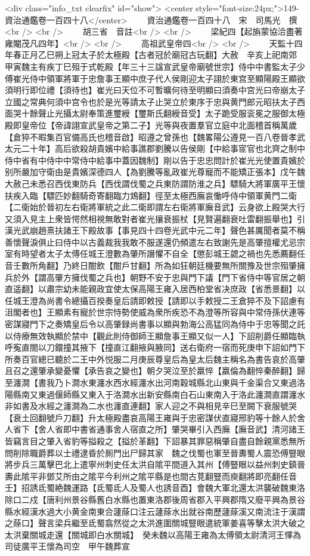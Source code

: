 <div class="info_txt clearfix" id="show">
<center style="font-size:24px;">149-資治通鑑卷一百四十八</center>
  　　資治通鑑卷一百四十八　宋　司馬光　撰<br />
<br />
　　胡三省　音註<br />
<br />
　　梁紀四【起旃蒙協洽盡著雍閹茂凡四年】<br />
<br />
　　高祖武皇帝四<br />
<br />
　　天監十四年春正月乙巳朔上冠太子於太極殿【古者冠於廟冠古玩翻】大赦　辛亥上祀南郊　甲寅魏主有疾丁巳殂于式乾殿【年三十三諡宣武皇帝廟號世宗】侍中中書監太子少傅崔光侍中領軍將軍于忠詹事王顯中庶子代人侯剛迎太子詡於東宫至顯陽殿王顯欲須明行即位禮【須待也】崔光曰天位不可暫曠何待至明顯曰須奏中宫光曰帝崩太子立國之常典何須中宫令也於是光等請太子止哭立於東序于忠與黄門郎元昭扶太子西面哭十餘聲止光攝太尉奉策進璽綬【璽斯氏翻綬音受】太子跪受服衮冕之服御太極殿即皇帝位【帝諱詡宣武皇帝之第二子】光等與夜置羣官立庭中北面稽首稱萬歲【倉猝不暇集百官備高氏也稽音啟】昭遵之曾孫也【魏畧陽公遵見一百八卷晉孝武太元二十年】高后欲殺胡貴嬪中給事譙郡劉騰以告侯剛【中給事宧官也北齊之制中侍中省有中侍中中常侍中給事中蓋因魏制】剛以告于忠忠問計於崔光光使置貴嬪於别所嚴加守衛由是貴嬪深德四人【為劉騰等亂政崔光尊寵而不能矯正張本】戊午魏大赦己未悉召西伐東防兵【西伐謂伐蜀之兵東防謂防淮之兵】驃騎大將軍廣平王懷扶疾入臨【驃匹妙翻騎奇寄翻臨力鴆翻】徑至太極西廡哀慟呼侍中領軍黄門二衛【二衛始於晉初左右衛將軍統之此二衛即謂左右衛將軍廡音武】云身欲上殿哭大行又須入見主上衆皆愕然相視無敢對者崔光攘衰振杖【見賢遍翻衰吐雷翻振舉也】引漢光武崩趙熹扶諸王下殿故事【事見四十四卷光武中元二年】聲色甚厲聞者莫不稱善懷聲淚俱止曰侍中以古義裁我我敢不服遂還仍頻遣左右致謝先是高肇擅權尤忌宗室有時望者太子太傅任城王澄數為肇所譖懼不自全【懲彭城王勰之禍也先悉薦翻任音壬數所角翻】乃終日酣飲【酣戶甘翻】所為如狂朝廷機要無所關豫及世宗殂肇擁兵於外【謂高肇方擁伐蜀之兵也】朝野不安于忠與門下議【門下省侍中等官居之朝直遥翻】以肅宗幼未能親政宜使太保高陽王雍入居西柏堂省决庶政【省悉景翻】以任城王澄為尚書令總攝百揆奏皇后請即敕授【請即以手敕授二王倉猝不及下詔慮有沮閣者也】王顯素有寵於世宗恃勢使威為衆所疾恐不為澄等所容與中常侍孫伏連等密謀寢門下之奏矯皇后令以高肇録尚書事以顯與勃海公高猛同為侍中于忠等聞之託以侍療無效執顯於禁中【觀此則侍御師王顯詹事王顯又似一人】下詔削爵任顯臨執呼寃直閤以刀鐶撞其掖下【撞直江翻掖與腋同】送右衛府一宿而死庚申下詔如門下所奏百官總已聽於二王中外悦服二月庚辰尊皇后為皇太后魏主稱名為書告哀於高肇且召之還肇承變憂懼【承告哀之變也】朝夕哭泣至於羸悴【羸倫為翻悴秦醉翻】歸至瀍澗【書我乃卜澗水東瀍水西水經瀍水出河南穀城縣北山東與千金渠合又東過洛陽縣南又東過偃師縣又東入于洛澗水出新安縣南白石山東南入于洛此瀍澗直謂瀍水非如書及水經之瀍澗為二水也瀍直連翻】家人迎之不與相見辛巳至闕下衰服號哭【衰土回翻號戶刀翻】升太極殿盡哀高陽王雍與于忠密謀伏直寢邢豹等十餘人於舍人省下【舍人省即中書省通事舍人宿直之所】肇哭畢引入西廡【廡音武】清河諸王皆竊言目之肇入省豹等搤殺之【搤於革翻】下詔暴其罪惡稱肇自盡自餘親黨悉無所問削除職爵葬以士禮逮昏於厠門出尸歸其家　魏之伐蜀也軍至晉夀蜀人震恐傅豎眼將步兵三萬擊巴北上遣寧州刺史任太洪自隂平間道入其州【傅豎眼以益州刺史鎮晉夀此隂平非鄧艾所由之隂平今利州之隂平縣是也間古莧翻豎而庾翻將即亮翻任音壬】招誘氐蜀絶魏運路【氐蜀氐人及蜀人也誘音酉】會魏大軍北還太洪襲破魏東洛除口二戍【唐利州景谷縣舊白水縣也置東洛郡後周省郡入平興郡隋又廢平興為景谷縣水經漢水過大小黄金南東合蘧蒢口注云蘧蒢水出就谷南歷蘧蒢溪又南流注于漢謂之蒢口】聲言梁兵繼至氐蜀翕然從之太洪進圍關城豎眼遣統軍姜喜等擊太洪大破之太洪棄關城走還【關城即白水關城】　癸未魏以高陽王雍為太傅領太尉清河王懌為司徒廣平王懷為司空　甲午魏葬宣
